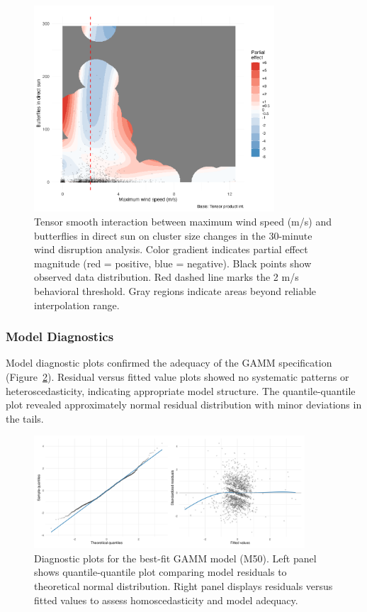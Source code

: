 \begin{figure}[htbp]
    \centering
    \includegraphics[width=0.8\textwidth]{supplemental/results/30_min/figures/interaction_wind_x_sun_binned.png}
    \caption[Wind × sunlight interaction (30-minute analysis)]{Tensor smooth interaction between maximum wind speed (m/s) and butterflies in direct sun on cluster size changes in the 30-minute wind disruption analysis. Color gradient indicates partial effect magnitude (red = positive, blue = negative). Black points show observed data distribution. Red dashed line marks the 2 m/s behavioral threshold. Gray regions indicate areas beyond reliable interpolation range.}
    \label{fig:interaction_wind_sun}
\end{figure}

\subsubsection{Model Diagnostics}

Model diagnostic plots confirmed the adequacy of the GAMM specification (Figure~\ref{fig:model_diagnostics_30min}). Residual versus fitted value plots showed no systematic patterns or heteroscedasticity, indicating appropriate model structure. The quantile-quantile plot revealed approximately normal residual distribution with minor deviations in the tails.

\begin{figure}[htbp]
    \centering
    \includegraphics[width=0.9\textwidth]{supplemental/results/30_min/figures/diag_qq_and_residuals_1x2.png}
    \caption[Diagnostic plots (M50)]{Diagnostic plots for the best-fit GAMM model (M50). Left panel shows quantile-quantile plot comparing model residuals to theoretical normal distribution. Right panel displays residuals versus fitted values to assess homoscedasticity and model adequacy.}
    \label{fig:model_diagnostics_30min}
\end{figure}

